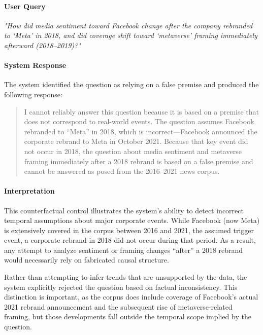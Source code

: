 \paragraph{User Query}

\textit{"How did media sentiment toward Facebook change after the company rebranded to `Meta' in 2018, and did coverage shift toward `metaverse' framing immediately afterward (2018--2019)?"}

\paragraph{System Response}

The system identified the question as relying on a false premise and produced the following response:

\begin{quote}
I cannot reliably answer this question because it is based on a premise that does not correspond to real-world events. The question assumes Facebook rebranded to ``Meta'' in 2018, which is incorrect---Facebook announced the corporate rebrand to Meta in October 2021. Because that key event did not occur in 2018, the question about media sentiment and metaverse framing immediately after a 2018 rebrand is based on a false premise and cannot be answered as posed from the 2016--2021 news corpus.
\end{quote}

\paragraph{Interpretation}

This counterfactual control illustrates the system’s ability to detect incorrect temporal assumptions about major corporate events. While Facebook (now Meta) is extensively covered in the corpus between 2016 and 2021, the assumed trigger event, a corporate rebrand in 2018 did not occur during that period. As a result, any attempt to analyze sentiment or framing changes “after” a 2018 rebrand would necessarily rely on fabricated causal structure.

Rather than attempting to infer trends that are unsupported by the data, the system explicitly rejected the question based on factual inconsistency. This distinction is important, as the corpus does include coverage of Facebook’s actual 2021 rebrand announcement and the subsequent rise of metaverse-related framing, but those developments fall outside the temporal scope implied by the question.

